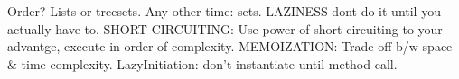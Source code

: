 \documentclass[10pt]{article}
\begin{document}
\begin{landscape}
\begin{multicols*}{6}
Order? Lists or treesets. Any other time: sets. LAZINESS dont do it until you actually have to. SHORT CIRCUITING: Use power of short circuiting to your advantge, execute in order of complexity. MEMOIZATION: Trade off b/w space \& time complexity. LazyInitiation: don't instantiate until method call. 

\end{multicols*}
\end{landscape}
\end{document}
